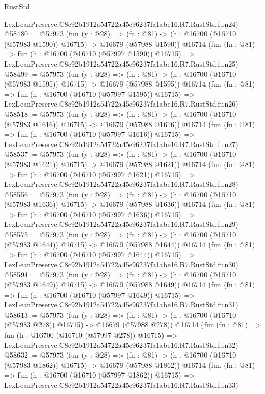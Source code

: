 \begin{lexlean}{RustStd}
\begin{coremodule}
    LexLeanPreserve.C8c92b1912a54722a45e96237fa1abe16.R7.RustStd.fun24)
@58480 := @57973
    (fun (y : @28) =>
    (fn : @81) -> (h : @16700 (@16710 (@57983 @1590)) @16715) -> @16679 (@57988 @1590))
    @16714
    (fun (fn : @81) =>
    fun (h : @16700 (@16710 (@57997 @1590)) @16715) =>
    LexLeanPreserve.C8c92b1912a54722a45e96237fa1abe16.R7.RustStd.fun25)
@58499 := @57973
    (fun (y : @28) =>
    (fn : @81) -> (h : @16700 (@16710 (@57983 @1595)) @16715) -> @16679 (@57988 @1595))
    @16714
    (fun (fn : @81) =>
    fun (h : @16700 (@16710 (@57997 @1595)) @16715) =>
    LexLeanPreserve.C8c92b1912a54722a45e96237fa1abe16.R7.RustStd.fun26)
@58518 := @57973
    (fun (y : @28) =>
    (fn : @81) -> (h : @16700 (@16710 (@57983 @1616)) @16715) -> @16679 (@57988 @1616))
    @16714
    (fun (fn : @81) =>
    fun (h : @16700 (@16710 (@57997 @1616)) @16715) =>
    LexLeanPreserve.C8c92b1912a54722a45e96237fa1abe16.R7.RustStd.fun27)
@58537 := @57973
    (fun (y : @28) =>
    (fn : @81) -> (h : @16700 (@16710 (@57983 @1621)) @16715) -> @16679 (@57988 @1621))
    @16714
    (fun (fn : @81) =>
    fun (h : @16700 (@16710 (@57997 @1621)) @16715) =>
    LexLeanPreserve.C8c92b1912a54722a45e96237fa1abe16.R7.RustStd.fun28)
@58556 := @57973
    (fun (y : @28) =>
    (fn : @81) -> (h : @16700 (@16710 (@57983 @1636)) @16715) -> @16679 (@57988 @1636))
    @16714
    (fun (fn : @81) =>
    fun (h : @16700 (@16710 (@57997 @1636)) @16715) =>
    LexLeanPreserve.C8c92b1912a54722a45e96237fa1abe16.R7.RustStd.fun29)
@58575 := @57973
    (fun (y : @28) =>
    (fn : @81) -> (h : @16700 (@16710 (@57983 @1644)) @16715) -> @16679 (@57988 @1644))
    @16714
    (fun (fn : @81) =>
    fun (h : @16700 (@16710 (@57997 @1644)) @16715) =>
    LexLeanPreserve.C8c92b1912a54722a45e96237fa1abe16.R7.RustStd.fun30)
@58594 := @57973
    (fun (y : @28) =>
    (fn : @81) -> (h : @16700 (@16710 (@57983 @1649)) @16715) -> @16679 (@57988 @1649))
    @16714
    (fun (fn : @81) =>
    fun (h : @16700 (@16710 (@57997 @1649)) @16715) =>
    LexLeanPreserve.C8c92b1912a54722a45e96237fa1abe16.R7.RustStd.fun31)
@58613 := @57973
    (fun (y : @28) =>
    (fn : @81) -> (h : @16700 (@16710 (@57983 @278)) @16715) -> @16679 (@57988 @278))
    @16714
    (fun (fn : @81) =>
    fun (h : @16700 (@16710 (@57997 @278)) @16715) =>
    LexLeanPreserve.C8c92b1912a54722a45e96237fa1abe16.R7.RustStd.fun32)
@58632 := @57973
    (fun (y : @28) =>
    (fn : @81) -> (h : @16700 (@16710 (@57983 @1862)) @16715) -> @16679 (@57988 @1862))
    @16714
    (fun (fn : @81) =>
    fun (h : @16700 (@16710 (@57997 @1862)) @16715) =>
    LexLeanPreserve.C8c92b1912a54722a45e96237fa1abe16.R7.RustStd.fun33)

\end{coremodule}
\end{lexlean}
